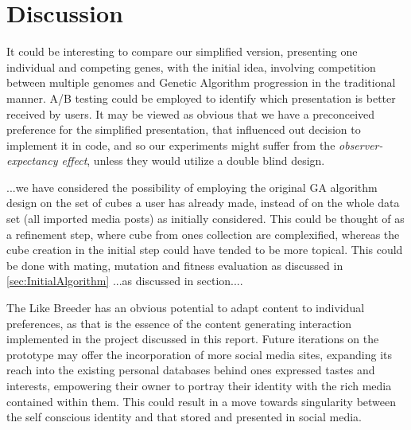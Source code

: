 \documentclass[]{article}
\begin{document}
\section{Discussion}
\label{sec:Discussion}

It could be interesting to compare our simplified version, presenting one individual and competing genes, with the initial idea, involving competition between multiple genomes and Genetic Algorithm progression in the traditional manner.  A/B testing could be employed to identify which presentation is better received by users.  It may be viewed as obvious that we have a preconceived preference for the simplified presentation, that influenced out decision to implement it in code, and so our experiments might suffer from the \textit{observer-expectancy effect}, unless they would utilize a double blind design.

...we have considered the possibility of employing the original GA algorithm design on the set of cubes a user has already made, instead of on the whole data set (all imported media posts) as initially considered.  This could be thought of as a refinement step, where cube from ones collection are complexified, whereas the cube creation in the initial step could have tended to be more topical.  This could be done with mating, mutation and fitness evaluation as discussed in \autoref{sec:InitialAlgorithm}  ...as discussed in section....

The Like Breeder has an obvious potential to adapt content to individual preferences, as that is the essence of the content generating interaction implemented in the project discussed in this report.  Future iterations on the prototype may offer the incorporation of more social media sites, expanding its reach into the existing personal databases behind ones expressed tastes and interests, empowering their owner to portray their identity with the rich media contained within them.  This could result in a move towards singularity between the self conscious identity and that stored and presented in social media.
\end{document}
